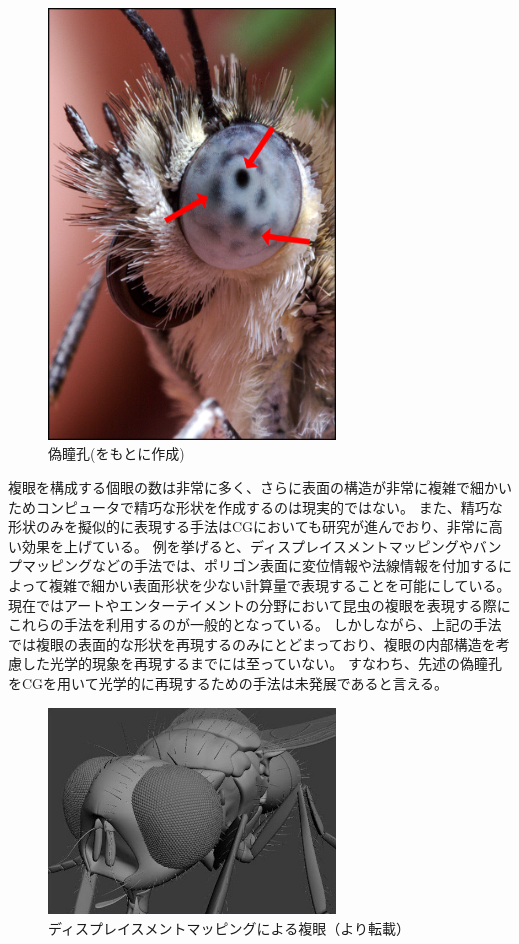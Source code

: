\begin{figure}[htbp]
  \centering
  \includegraphics[width=3.0in]{./img/what_is_pseudopupil.png}
  \caption{偽瞳孔(\cite{flickr-blueeye}をもとに作成)}
  \label{FWhatIsPseudopupil}
\end{figure}


複眼を構成する個眼の数は非常に多く、さらに表面の構造が非常に複雑で細かいためコンピュータで精巧な形状を作成するのは現実的ではない。
また、精巧な形状のみを擬似的に表現する手法はCGにおいても研究が進んでおり、非常に高い効果を上げている。
例を挙げると、ディスプレイスメントマッピングやバンプマッピングなどの手法\cite{making-of-upside-down}では、ポリゴン表面に変位情報や法線情報を付加するによって複雑で細かい表面形状を少ない計算量で表現することを可能にしている。
現在ではアートやエンターテイメントの分野において昆虫の複眼を表現する際にこれらの手法を利用するのが一般的となっている。
しかしながら、上記の手法では複眼の表面的な形状を再現するのみにとどまっており、複眼の内部構造を考慮した光学的現象を再現するまでには至っていない。
すなわち、先述の偽瞳孔をCGを用いて光学的に再現するための手法は未発展であると言える。

\begin{figure}[hn]
  \centering
  \includegraphics[width=3.0in]{./img/displacement.jpg}
  \caption{ディスプレイスメントマッピングによる複眼（\cite{making-of-upside-down}より転載）}
  \label{FDisplacement}
\end{figure}

